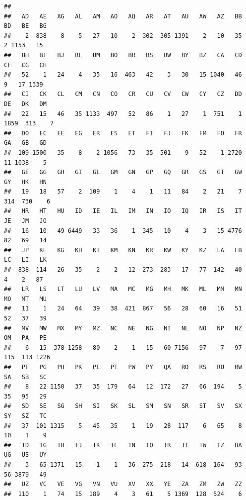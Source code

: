 \documentclass[
  12pt,
]{article}
\newenvironment{Shaded}{\begin{snugshade}}{\end{snugshade}}
\newcommand{\CommentTok}[1]{\textcolor[rgb]{0.56,0.35,0.01}{\textit{#1}}}
\newcommand{\FunctionTok}[1]{\textcolor[rgb]{0.00,0.00,0.00}{#1}}
\newcommand{\NormalTok}[1]{#1}
\newcommand{\SpecialCharTok}[1]{\textcolor[rgb]{0.00,0.00,0.00}{#1}}
\begin{document}
\begin{Shaded}
\end{Shaded}

\begin{verbatim}
## 
##   AD   AE   AG   AL   AM   AO   AQ   AR   AT   AU   AW   AZ   BB   BD   BE   BG 
##    2  838    8    5   27   10    2  302  305 1391    2   10   35    2 1153   15 
##   BH   BI   BJ   BL   BM   BO   BR   BS   BW   BY   BZ   CA   CD   CF   CG   CH 
##   52    1   24    4   35   16  463   42    3   30   15 1040   46    9   17 1339 
##   CI   CK   CL   CM   CN   CO   CR   CU   CV   CW   CY   CZ   DD   DE   DK   DM 
##   22   15   46   35 1133  497   52   86    1   27    1  751    1 1859  313    7 
##   DO   EC   EE   EG   ER   ES   ET   FI   FJ   FK   FM   FO   FR   GA   GB   GD 
##  109 1500   35    8    2 1056   73   35  501    9   52    1 2720   11 1038    5 
##   GE   GG   GH   GI   GL   GM   GN   GP   GQ   GR   GS   GT   GW   GY   HK   HN 
##   19   18   57    2  109    1    4    1   11   84    2   21    7  314  730    6 
##   HR   HT   HU   ID   IE   IL   IM   IN   IO   IQ   IR   IS   IT   JE   JM   JO 
##   16   10   49 6449   33   36    1  345   10    4    3   15 4776   82   69   14 
##   JP   KE   KG   KH   KI   KM   KN   KR   KW   KY   KZ   LA   LB   LC   LI   LK 
##  838  114   26   35    2    2   12  273  283   17   77  142   40    4    2   87 
##   LR   LS   LT   LU   LV   MA   MC   MG   MH   MK   ML   MM   MN   MO   MT   MU 
##   11    1   24   64   39   38  421  867   56   28   60   16   51   52   37   39 
##   MV   MW   MX   MY   MZ   NC   NE   NG   NI   NL   NO   NP   NZ   OM   PA   PE 
##    6   15  378 1258   80    2    1   15   60 7156   97    7   97  115  113 1226 
##   PF   PG   PH   PK   PL   PT   PW   PY   QA   RO   RS   RU   RW   SA   SB   SC 
##    8   22 1150   37   35  179   64   12  172   27   66  194    5   35   95   29 
##   SD   SE   SG   SH   SI   SK   SL   SM   SN   SR   ST   SV   SX   SY   SZ   TC 
##   37  101 1315    5   45   35    1   19   28  117    6   65    8   10    1    9 
##   TD   TG   TH   TJ   TK   TL   TN   TO   TR   TT   TW   TZ   UA   UG   US   UY 
##    3   65 1371   15    1    1   36  275  218   14  618  164   93   56 3879   49 
##   UZ   VC   VE   VG   VN   VU   XV   XX   YE   ZA   ZM   ZW   ZZ 
##  110    1   74   15  189    4    3   61    5 1369  128  524    6
\end{verbatim}
\end{document}
